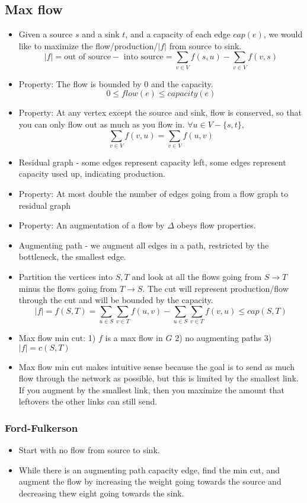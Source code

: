 \subsection{Max flow}
\begin{itemize}
    \item Given a source $s$ and a sink $t$, and a capacity of each edge $cap(e)$, we would like to maximize the flow/production/$|f|$ from source to sink. $$|f| = \textrm{out of source} - \textrm{ into source} = \sum_{v\in V}f(s,u) - \sum_{v\in V}f(v,s)$$
    \item Property: The flow is bounded by 0 and the capacity. $$0 \leq flow(e) \leq capacity(e)$$
    \item Property: At any vertex except the source and sink, flow is conserved, so that you can only flow out as much as you flow in. $\forall u \in V - \{s,t\}$, $$\sum_{v\in V} f(v,u) = \sum_{v\in V}f(u,v)$$

    \item Residual graph - some edges represent capacity left, some edges represent capacity used up, indicating production.
    \item Property: At most double the number of edges going from a flow graph to residual graph
    \item Property: An augmentation of a flow by $\Delta$ obeys flow properties.
    \item Augmenting path - we augment all edges in a path, restricted by the bottleneck, the smallest edge.
    \item Partition the vertices into $S,T$ and look at all the flows going from $S\to T$ minus the flows going from $T\to S$. The cut will represent production/flow through the cut and will be bounded by the capacity.
    $$|f| = f(S,T) = \sum_{u\in S}\sum_{v\in T}f(u,v) - \sum_{u\in S}\sum_{v\in T}f(v,u) \leq cap(S,T)$$
    \item Max flow min cut: 1) $f$ is a max flow in $G$ 2) no augmenting paths 3) $|f| = c(S,T)$
    \item Max flow min cut makes intuitive sense because the goal is to send as much flow through the network as possible, but this is limited by the smallest link. If you augment by the smallest link, then you maximize the amount that leftovers the other links can still send.
\end{itemize}
\subsubsection{Ford-Fulkerson}
\begin{itemize}
    \item Start with no flow from source to sink.
    \item While there is an augmenting path capacity edge, find the min cut, and augment the flow by increasing the weight going towards the source and decreasing thew eight going towards the sink.
\end{itemize}
